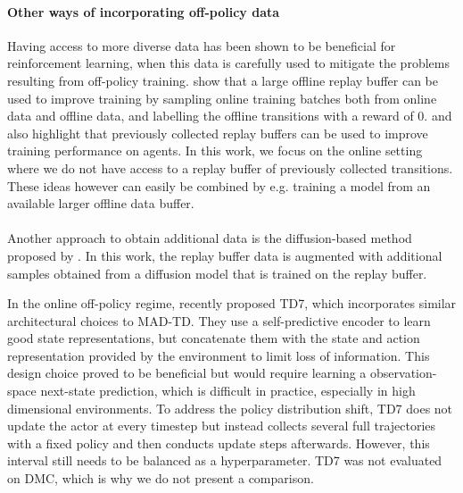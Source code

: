 \paragraph{Other ways of incorporating off-policy data} Having access to more diverse data has been shown to be beneficial for reinforcement learning, when this data is carefully used to mitigate the problems resulting from off-policy training.
\textcite{ball2023efficient} show that a large offline replay buffer can be used to improve training by sampling online training batches both from online data and offline data, and labelling the offline transitions with a reward of 0.
\textcite{agarwal2022reincarnating} and \textcite{tirumala2024replay} also highlight that previously collected replay buffers can be used to improve training performance on agents.
In this work, we focus on the online setting where we do not have access to a replay buffer of previously collected transitions.
These ideas however can easily be combined by e.g. training a model from an available larger offline data buffer.

\paragraph{} Another  approach to obtain additional data is the diffusion-based method proposed by \textcite{lu2024synthetic}.
In this work, the replay buffer data is augmented with additional samples obtained from a diffusion model that is trained on the replay buffer.

In the online off-policy regime, \textcite{fujimoto2024sale} recently proposed TD7, which incorporates similar architectural choices to MAD-TD.
They use a self-predictive encoder to learn good state representations, but concatenate them with the state and action representation provided by the environment to limit loss of information.
This design choice proved to be beneficial but would require learning a observation-space next-state prediction, which is difficult in practice, especially in high dimensional environments.
To address the policy distribution shift, TD7 does not update the actor at every timestep but instead collects several full trajectories with a fixed policy and then conducts update steps afterwards.
However, this interval still needs to be balanced as a hyperparameter.
TD7 was not evaluated on DMC, which is why we do not present a comparison.


